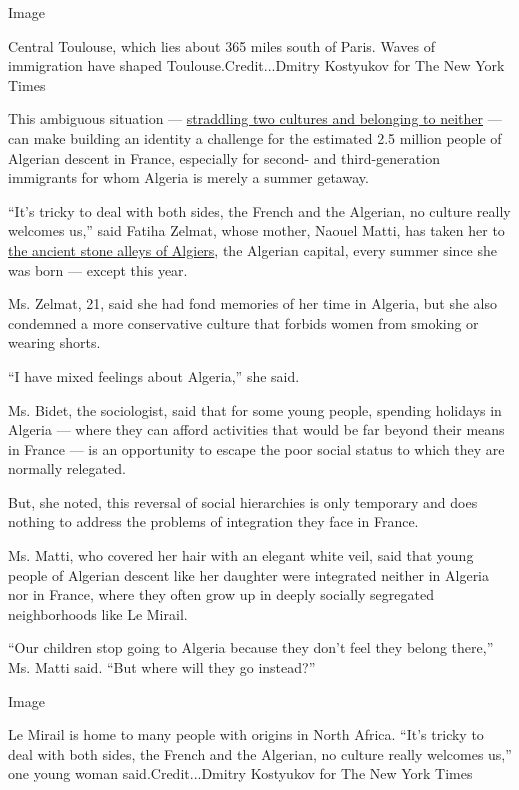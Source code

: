 Image

Central Toulouse, which lies about 365 miles south of Paris. Waves of
immigration have shaped Toulouse.Credit...Dmitry Kostyukov for The New
York Times

This ambiguous situation ---
\href{https://www.nytimes3xbfgragh.onion/2015/08/16/world/africa/france-algeria-immigration-discrimination-racism.html}{straddling
two cultures and belonging to neither} --- can make building an identity
a challenge for the estimated 2.5 million people of Algerian descent in
France, especially for second- and third-generation immigrants for whom
Algeria is merely a summer getaway.

``It's tricky to deal with both sides, the French and the Algerian, no
culture really welcomes us,'' said Fatiha Zelmat, whose mother, Naouel
Matti, has taken her to
\href{https://www.nytimes3xbfgragh.onion/2019/05/05/world/africa/algeria-casbah-preservation-plan.html}{the
ancient stone alleys of Algiers}, the Algerian capital, every summer
since she was born --- except this year.

Ms. Zelmat, 21, said she had fond memories of her time in Algeria, but
she also condemned a more conservative culture that forbids women from
smoking or wearing shorts.

``I have mixed feelings about Algeria,'' she said.

Ms. Bidet, the sociologist, said that for some young people, spending
holidays in Algeria --- where they can afford activities that would be
far beyond their means in France --- is an opportunity to escape the
poor social status to which they are normally relegated.

But, she noted, this reversal of social hierarchies is only temporary
and does nothing to address the problems of integration they face in
France.

Ms. Matti, who covered her hair with an elegant white veil, said that
young people of Algerian descent like her daughter were integrated
neither in Algeria nor in France, where they often grow up in deeply
socially segregated neighborhoods like Le Mirail.

``Our children stop going to Algeria because they don't feel they belong
there,'' Ms. Matti said. ``But where will they go instead?''

Image

Le Mirail is home to many people with origins in North Africa. ``It's
tricky to deal with both sides, the French and the Algerian, no culture
really welcomes us,'' one young woman said.Credit...Dmitry Kostyukov for
The New York Times

